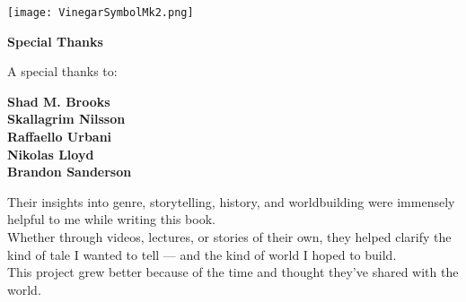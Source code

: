 \documentclass[12pt]{article}
\begin{document}


\newpage

\begin{titlepage}
\vspace*{\fill}
\begin{center}
\texttt{[image: VinegarSymbolMk2.png]}
\end{center}
\vspace*{\fill}
\end{titlepage}

\newpage

\begin{titlepage}
\vspace*{\fill}
\begin{center}
\textbf{\Large Special Thanks}
\vspace{2em}

\noindent
A special thanks to:

\vspace{1em}

\textbf{Shad M. Brooks} \\
\textbf{Skallagrim Nilsson}\\
\textbf{Raffaello Urbani} \\
\textbf{Nikolas Lloyd} \\
\textbf{Brandon Sanderson}

\end{center}

\vspace{1.5em}


Their insights into genre, storytelling, history, and worldbuilding were immensely helpful to me while writing this book. \\

\noindent
Whether through videos, lectures, or stories of their own, they helped clarify the kind of tale I wanted to tell — and the kind of world I hoped to build. \\

\noindent
This project grew better because of the time and thought they’ve shared with the world.

\vspace*{\fill}
\end{titlepage}

\newpage
\end{document}
